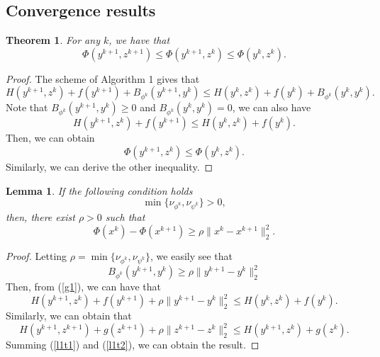 \documentclass[12pt]{article}
\newtheorem{theorem}{Theorem}
\newtheorem{proof}{Proof}
\newtheorem{lemma}{Lemma}
\begin{document}
\subsection{Convergence results}
\begin{theorem}\label{gld}
For any $k$, we have that
\begin{equation}
    \Phi(y^{k+1},z^{k+1})\leq\Phi(y^{k+1},z^{k})\leq\Phi(y^{k},z^{k}).
\end{equation}
\end{theorem}
\begin{proof}
The scheme of  Algorithm 1 gives that
\begin{equation}\label{g1}
    H(y^{k+1},z^k)+f(y^{k+1})+B_{\phi^k}(y^{k+1},y^k)\leq H(y^{k},z^k)+f(y^k)+B_{\phi^k}(y^k,y^k).
\end{equation}
Note that $B_{\phi^k}(y^{k+1},y^k)\geq 0$ and  $B_{\phi^k}(y^{k},y^k)=0$, we can also have
\begin{equation}
    H(y^{k+1},z^k)+f(y^{k+1})\leq H(y^{k},z^k)+f(y^k).
\end{equation}
Then, we can obtain
\begin{equation}
    \Phi(y^{k+1},z^{k})\leq\Phi(y^{k},z^{k}).
\end{equation}
Similarly, we can derive the other inequality.
\end{proof}

\begin{lemma}\label{descend}
If the following condition holds
\begin{equation}\label{condition}
    \min\{\nu_{\phi^k},\nu_{\psi^k}\}>0,
\end{equation}
then, there exist $\rho>0$ such that
\begin{equation}
    \Phi(x^k)-\Phi(x^{k+1})\geq \rho\|x^k-x^{k+1}\|_2^2.
\end{equation}
\end{lemma}
\begin{proof}
Letting $\rho=\min\{\nu_{\phi^k},\nu_{\psi^k}\}$,
we easily see that
\begin{equation}
    B_{\phi^k}(y^{k+1},y^k)\geq\rho\|y^{k+1}-y^k\|_2^2
\end{equation}
Then, from (\ref{g1}), we can have that
\begin{equation}\label{l1t1}
    H(y^{k+1},z^k)+f(y^{k+1})+\rho\|y^{k+1}-y^k\|_2^2\leq H(y^{k},z^k)+f(y^k).
\end{equation}
Similarly, we can obtain that
\begin{equation}\label{l1t2}
    H(y^{k+1},z^{k+1})+g(z^{k+1})+\rho\|z^{k+1}-z^k\|_2^2\leq H(y^{k+1},z^{k})+g(z^{k}).
\end{equation}
Summing (\ref{l1t1}) and (\ref{l1t2}), we can obtain the result.
\end{proof}
\end{document}
